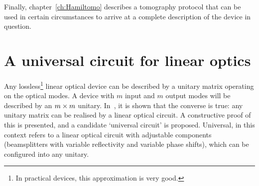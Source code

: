 Finally, chapter~\ref{ch:Hamiltomo} describes a tomography protocol that can be
used in certain circumstances to arrive at a complete description of the device
in question.

\section{A universal circuit for linear optics}
\label{sec:ReckScheme}
Any lossless\footnote{In practical devices, this approximation is very good.
} linear optical device can be
described by a unitary matrix operating on the optical modes. A device with
\(m\) input and \(m\) output modes will be described by an \(m \times m\) unitary.
In~\cite{reck}, it is shown that the converse is true: any unitary matrix can
be realised by a linear optical circuit. A constructive proof of this is
presented, and a candidate `universal circuit' is proposed. Universal, in this
context refers to a linear optical circuit with adjustable components
(beamsplitters with variable reflectivity and variable phase shifts), which can
be configured into any unitary.

